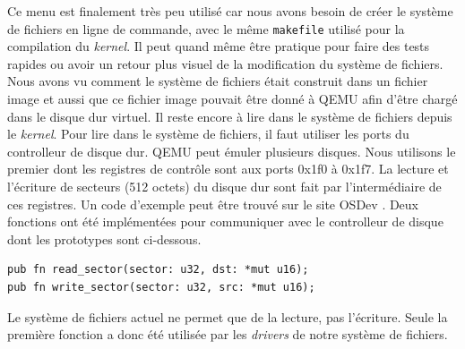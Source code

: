 Ce menu est finalement très peu utilisé car nous avons besoin de créer le système
de fichiers en ligne de commande, avec le même \texttt{makefile} utilisé
pour la compilation du \textit{kernel}. Il peut quand même être pratique pour faire
des tests rapides ou avoir un retour plus visuel de la modification
du système de fichiers. Nous avons vu comment le système de fichiers était construit
dans un fichier image et aussi que ce fichier image pouvait être donné à QEMU afin
d'être chargé dans le disque dur virtuel. Il reste encore à lire dans le système
de fichiers depuis le \textit{kernel}. Pour lire dans le système de fichiers, il
faut utiliser les ports du controlleur de disque dur. QEMU peut émuler plusieurs
disques. Nous utilisons le premier dont les registres de contrôle sont aux ports
0x1f0 à 0x1f7. La lecture et l'écriture de secteurs (512 octets) du disque dur
sont fait par l'intermédiaire de ces registres. Un code d'exemple peut être trouvé
sur le site OSDev \cite{ref24}. Deux fonctions ont été implémentées pour communiquer
avec le controlleur de disque dont les prototypes sont ci-dessous.

\begin{verbatim}
pub fn read_sector(sector: u32, dst: *mut u16);
pub fn write_sector(sector: u32, src: *mut u16);
\end{verbatim}

Le système de fichiers actuel ne permet que de la lecture, pas l'écriture.
Seule la première fonction a donc été utilisée par les \textit{drivers} de
notre système de fichiers.